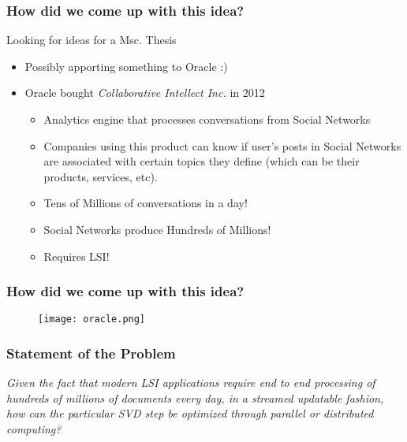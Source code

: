 \begin{frame}[plain]
  \frametitle{How did we come up with this idea?}
  \begin{block}{}
    Looking for ideas for a Msc. Thesis
    \begin{itemize}
      \item Possibly apporting something to Oracle :)
    	\item Oracle bought \textit{Collaborative Intellect Inc.} in 2012
    \begin{itemize}
      \item Analytics engine that processes conversations from Social Networks
      	\item Companies using this product can know if user's posts in
          Social Networks are associated with certain topics they
          define (which can be their products, services, etc).
      \item Tens of Millions of conversations in a day!
      \item Social Networks produce Hundreds of Millions!
      \item Requires LSI!
    \end{itemize}
     \end{itemize}
  \end{block} 
\end{frame}
\begin{frame}[plain]
  \frametitle{How did we come up with this idea?}
\begin{center}
  \begin{figure}[H]
    \centering
    \texttt{[image: oracle.png]}
  \end{figure}
\end{center}
\end{frame}
\begin{frame}[plain]
  \frametitle{Statement of the Problem}
  \begin{block}{}
  \textit{Given the fact that modern LSI applications require end to end
processing of hundreds of millions of documents every day, in a streamed
updatable fashion, how can the particular SVD step be optimized through parallel
or distributed computing?}
  \end{block} 
\end{frame}
